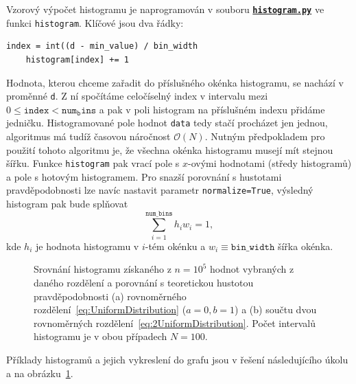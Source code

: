 \documentclass[a4paper,11pt,twoside]{article}
\def\code#1{\textnormal{\texttt{#1}}}
\def\ghfile#1#2{\textnormal{\textbf{\texttt{\href{https://github.com/PavelStransky/PCInPhysics/blob/main/#1#2}{#2}}}}}
\theoremstyle{red}
\theoremstyle{green}
\begin{document}
    \begin{solution}
        Vzorový výpočet histogramu je naprogramován v souboru \ghfile{python/histogram/}{histogram.py} ve funkci \code{histogram}.
        Klíčové jsou dva řádky:

        \begin{lstlisting}[style=NormalPython]
    index = int((d - min_value) / bin_width
    histogram[index] += 1\end{lstlisting}
        Hodnota, kterou chceme zařadit do příslušného okénka histogramu, se nachází v proměnné \code{d}.
        Z ní spočítáme celočíselný index v intervalu mezi $0\leq\mathtt{index}<\mathtt{num_bins}$ a pak v poli histogram na příslušném indexu přidáme jedničku.
        Histogramované pole hodnot \code{data} tedy stačí procházet jen jednou, algoritmus má tudíž časovou náročnost $\mathcal{O}(N)$.
        Nutným předpokladem pro použití tohoto algoritmu je, že všechna okénka histogramu musejí mít stejnou šířku.
        Funkce \code{histogram} pak vrací pole s $x$-ovými hodnotami (středy histogramů) a pole s hotovým histogramem.
        Pro snazší porovnání s hustotami pravděpodobnosti lze navíc nastavit parametr \code{normalize=True}, výsledný histogram pak bude splňovat
        \begin{equation}
            \sum_{i=1}^{\mathtt{num\_bins}}h_{i}w_{i}=1,
        \end{equation}
        kde $h_{i}$ je hodnota histogramu v $i$-tém okénku a $w_{i}\equiv\mathtt{bin\_width}$ šířka okénka.

        \begin{figure}[!htbp]
            \begin{subfigure}{0.49\linewidth}
                \centering{}
                \caption{}
            \end{subfigure}
            \hfill
            \begin{subfigure}{0.49\linewidth}
                \centering{}
                \caption{}
            \end{subfigure}
            \caption{
                \protect\small
                Srovnání histogramu získaného z $n=10^{5}$ hodnot vybraných z daného rozdělení a porovnání s teoretickou hustotou pravděpodobnosti (a) rovnoměrného rozdělení~\eqref{eq:UniformDistribution} ($a=0,b=1$) a (b) součtu dvou rovnoměrných rozdělení~\eqref{eq:2UniformDistribution}.
                Počet intervalů histogramu je v obou případech $N=100$.
            }
            \label{fig:Distributions}
        \end{figure}
        
        Příklady histogramů a jejich vykreslení do grafu jsou v řešení následujícího úkolu a na obrázku~\ref{fig:Distributions}.
    \end{solution}
\end{document}
